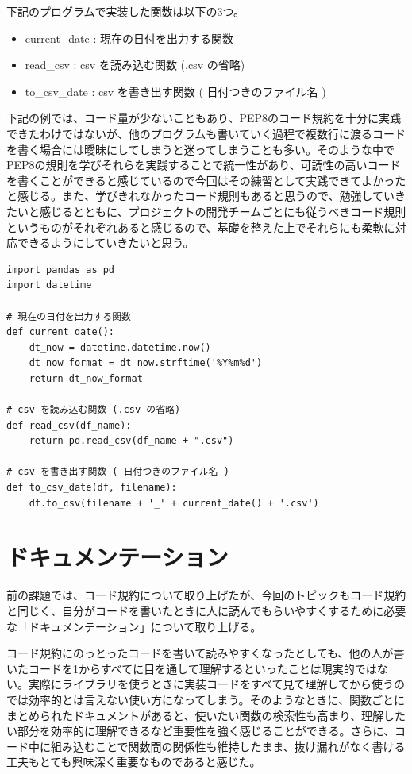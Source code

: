 \documentclass[12pt]{jsarticle}
\begin{document}
下記のプログラムで実装した関数は以下の3つ。
\begin{itemize}
  \item current\_date : 現在の日付を出力する関数
  \item read\_csv     : csv を読み込む関数 (.csv の省略)
  \item to\_csv\_date  : csv を書き出す関数 ( 日付つきのファイル名 )
\end{itemize}

下記の例では、コード量が少ないこともあり、PEP8のコード規約を十分に実践できたわけではないが、他のプログラムも書いていく過程で複数行に渡るコードを書く場合には曖昧にしてしまうと迷ってしまうことも多い。そのような中でPEP8の規則を学びそれらを実践することで統一性があり、可読性の高いコードを書くことができると感じているので今回はその練習として実践できてよかったと感じる。また、学びきれなかったコード規則もあると思うので、勉強していきたいと感じるとともに、プロジェクトの開発チームごとにも従うべきコード規則というものがそれぞれあると感じるので、基礎を整えた上でそれらにも柔軟に対応できるようにしていきたいと思う。

\begin{lstlisting}[caption=tips.py]
import pandas as pd
import datetime

# 現在の日付を出力する関数
def current_date():
    dt_now = datetime.datetime.now()
    dt_now_format = dt_now.strftime('%Y%m%d')
    return dt_now_format

# csv を読み込む関数 (.csv の省略)
def read_csv(df_name):
    return pd.read_csv(df_name + ".csv")

# csv を書き出す関数 ( 日付つきのファイル名 )
def to_csv_date(df, filename):
    df.to_csv(filename + '_' + current_date() + '.csv')

\end{lstlisting}

\newpage
\section{ドキュメンテーション}
前の課題では、コード規約について取り上げたが、今回のトピックもコード規約と同じく、自分がコードを書いたときに人に読んでもらいやすくするために必要な「ドキュメンテーション」について取り上げる。

コード規約にのっとったコードを書いて読みやすくなったとしても、他の人が書いたコードを1からすべてに目を通して理解するといったことは現実的ではない。実際にライブラリを使うときに実装コードをすべて見て理解してから使うのでは効率的とは言えない使い方になってしまう。そのようなときに、関数ごとにまとめられたドキュメントがあると、使いたい関数の検索性も高まり、理解したい部分を効率的に理解できるなど重要性を強く感じることができる。さらに、コード中に組み込むことで関数間の関係性も維持したまま、抜け漏れがなく書ける工夫もとても興味深く重要なものであると感じた。
\end{document}
